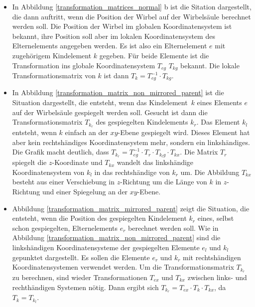 \begin{itemize}
 \item In Abbildung \ref{transformation_matrices_normal} b ist die Sitation dargestellt, die \ua dann auftritt, wenn die Position der Wirbel auf der Wirbelsäule berechnet werden soll. Die Position der Wirbel im globalen Koordinatensystem ist bekannt, ihre Position soll aber im lokalen Koordinatensystem des Elternelements angegeben werden. Es ist also ein Elternelement $e$ mit zugehörigem Kindelement $k$ gegeben. Für beide Elemente ist die Transformation ins globale Koordinatensystem $T_{eg}$ \bzw $T_{kg}$ bekannt. Die lokale Transformationsmatrix von $k$ ist dann $T_k = T^{-1}_{eg} \cdot T_{kg}$.
 
 \item In Abbildung \ref{transformation_matrix_non_mirrored_parent} ist die Situation dargestellt, die entsteht, wenn das \mbox{Kindelement $k$} eines Elements $e$ auf der Wirbelsäule gespiegelt werden soll. Gesucht ist dann die Transformationsmatrix $T_{k_r}$ des gespiegelten Kindelements $k_r$. Das Element $k_l$ entsteht, wenn $k$ einfach an der $xy$-Ebene gespiegelt wird. Dieses Element hat aber kein rechtshändiges Koordinatensystem mehr, sondern ein linkshändiges. Die Grafik macht deutlich, dass $T_{k_r} = T_{eg}^{-1} \cdot T_r \cdot T_{k_lg} \cdot T_{kx}$. Die Matrix $T_r$ spiegelt die $z$-Koordinate und $T_{kx}$ wandelt das linkshändige Koordinatensystem von $k_l$ in das rechtshändige von $k_r$ um. Die Abbildung $T_{kx}$ besteht aus einer Verschiebung in $z$-Richtung um die Länge von $k$ in $z$-Richtung und einer Spiegelung an der $xy$-Ebene.
 
 \item Abbildung \ref{transformation_matrix_mirrored_parent} zeigt die Situation, die entsteht, wenn die Position des gespiegelten Kindelement $k_r$ eines, selbst schon gespiegelten, Elternelements $e_r$ berechnet werden soll. Wie in Abbildung \ref{transformation_matrix_non_mirrored_parent} sind die linkshändigen Koordinatensysteme der gespiegelten Elemente $e_l$ und $k_l$ gepunktet dargestellt. Es sollen die Elemente $e_r$ und $k_r$ mit rechtshändigen Koordinatensystemen verwendet werden. Um die Transformationsmatrix $T_{k_r}$ zu berechnen, sind wieder Transformationen $T_{ex}$ und $T_{kx}$ zwischen links- und rechthändigen Systemen nötig. Dann ergibt sich $T_{k_r} = T_{ex} \cdot T_k \cdot T_{kx}$, da $T_k = T_{k_l}$.
\end{itemize}


